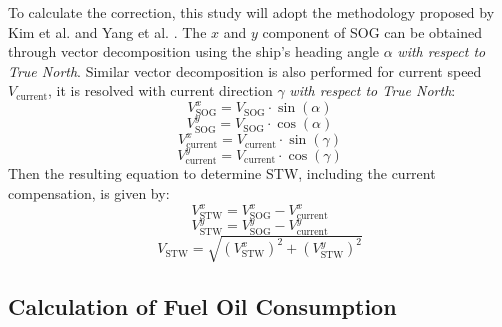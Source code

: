 To calculate the correction, this study will adopt the methodology proposed by Kim et al. \cite{Kim.2020b} and Yang et al. \cite{Yang.2020}. The $x$ and $y$ component of SOG can be obtained through vector decomposition using the ship's heading angle $\alpha$ \emph{with respect to True North}. Similar vector decomposition is also performed for current speed $V_{\text{current}}$, it is resolved with current direction $\gamma$ \emph{with respect to True North}:\\
\begin{equation}\label{eqn:sogx}
    V_{\text{SOG}}^x = V_{\text{SOG}}\cdot\sin(\alpha)   
\end{equation}
\begin{equation}\label{eqn:sogy}
    V_{\text{SOG}}^y = V_{\text{SOG}}\cdot\cos(\alpha)   
\end{equation} 
\begin{equation}\label{eqn:vcurrx}
     V_{\text{current}}^x = V_{\text{current}}\cdot\sin(\gamma)   
\end{equation}
\begin{equation}\label{eqn:vcurry}
    V_{\text{current}}^y = V_{\text{current}}\cdot\cos(\gamma)   
\end{equation}
Then the resulting equation to determine STW, including the current compensation, is given by:\\
\begin{equation}\label{eqn:stwx}
    V_{\text{STW}}^x = V_{\text{SOG}}^x - V_{\text{current}}^x    
\end{equation}
\begin{equation}\label{eqn:stwy}
    V_{\text{STW}}^y = V_{\text{SOG}}^y - V_{\text{current}}^y      
\end{equation}
\begin{equation}\label{eqn:stwabs}
    V_{\text{STW}} = \sqrt{(V_{\text{STW}}^x)^2 + (V_{\text{STW}}^y)^2} 
\end{equation}

\subsection{Calculation of Fuel Oil Consumption}\label{foc_calc}













    
